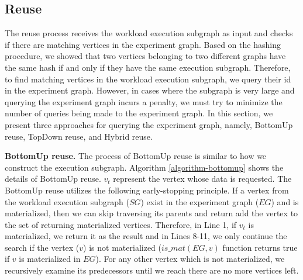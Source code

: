 \subsection{Reuse}
The reuse process receives the workload execution subgraph as input and checks if there are matching vertices in the experiment graph.
Based on the hashing procedure, we showed that two vertices belonging to two different graphs have the same hash if and only if they have the same execution subgraph.
Therefore, to find matching vertices in the workload execution subgraph, we query their id in the experiment graph.
However, in cases where the subgraph is very large and querying the experiment graph incurs a penalty, we must try to minimize the number of queries being made to the experiment graph.
In this section, we present three approaches for querying the experiment graph, namely, BottomUp reuse, TopDown reuse, and Hybrid reuse.

\textbf{BottomUp reuse.}
The process of BottomUp reuse is similar to how we construct the execution subgraph.
Algorithm \ref{algorithm-bottomup} shows the details of BottomUp reuse.
$v_t$ represent the vertex whose data is requested.
The BottomUp reuse utilizes the following early-stopping principle. 
If a vertex from the workload execution subgraph ($SG$) exist in the experiment graph ($EG$) and is materialized, then we can skip traversing its parents and return add the vertex to the set of returning materialized vertices.
Therefore, in Line 1, if $v_t$ is materialized, we return it as the result and in Lines 8-11, we only continue the search if the vertex ($v$) is not materialized ($is\_mat(EG, v)$ function returns true if $v$ is materialized in $EG$).
For any other vertex which is not materialized, we recursively examine its predecessors until we reach there are no more vertices left.

